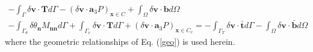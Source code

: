 \begin{subequations}
\begin{multline}
    - \int_\Gamma \delta \boldsymbol v \cdot \boldsymbol T d\Gamma 
    - (\delta \boldsymbol v \cdot \boldsymbol a_3 P)_{\boldsymbol x \in C}
    + \int_\Omega \delta \boldsymbol v \cdot \boldsymbol b d\Omega \\
    - \int_{\Gamma_\theta} \delta \theta_{\boldsymbol n} M_{\boldsymbol{nn}} d\Gamma
    + \int_{\Gamma_v} \delta \boldsymbol v \cdot \boldsymbol T d\Gamma 
    + (\delta \boldsymbol v \cdot \boldsymbol a_3 P)_{\boldsymbol x \in C_v}
    = - \int_{\Gamma_T} \delta \boldsymbol v \cdot \bar{\boldsymbol t} d\Gamma - \int_\Omega \delta \boldsymbol v \cdot \bar{\boldsymbol b} d\Omega
\end{multline}
\end{subequations}
where the geometric relationships of Eq. (\ref{geo}) is used herein.
